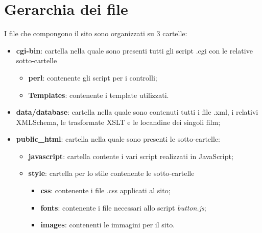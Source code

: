 \documentclass[../Relazione.tex]{subfiles}
\begin{document}
\section{Gerarchia dei file}

I file che compongono il sito sono organizzati su 3 cartelle:
\begin{itemize}
\item \textbf{cgi-bin}: cartella nella quale sono presenti tutti gli script .cgi con le relative sotto-cartelle
\begin{itemize}
	\item \textbf{perl}: contenente gli script per i controlli;
	\item \textbf{Templates}: contenente i template utilizzati.
\end{itemize}

\item \textbf{data/database}: cartella nella quale sono contenuti tutti i file .xml, i relativi XMLSchema, le trasformate XSLT e le locandine dei singoli film;
\item \textbf{public\_html}: cartella nella quale sono presenti le sotto-cartelle:
\begin{itemize}
	\item \textbf{javascript}: cartella contente i vari script realizzati in JavaScript;
	\item \textbf{style}: cartella per lo stile contenente le sotto-cartelle
	\begin{itemize}
		\item \textbf{css}: contenente i file .css applicati al sito;
		\item \textbf{fonts}: contenente i file necessari allo script \textit{button.js};
		\item \textbf{images}: contenenti le immagini per il sito.
	\end{itemize}
\end{itemize}

\end{itemize}

			
\end{document}

